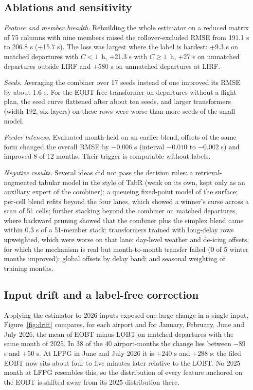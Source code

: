 \documentclass[
  manuscript=article,  %
  layout=preprint,  %
  year=20xx,
  volume=x,
]{extra/joas}
\begin{document}
\subsection{Ablations and sensitivity}

\textit{Feature and member breadth.} Rebuilding the whole estimator on a reduced matrix of 75 columns with nine members raised the rollover-excluded RMSE from 191.1 s to 206.8 s (+15.7 s). The loss was largest where the label is hardest: +9.3 s on matched departures with $C<1$~h, +21.3 s with $C \geq 1$~h, +27 s on unmatched departures outside LIRF and +580 s on unmatched departures at LIRF.

\textit{Seeds.} Averaging the combiner over 17 seeds instead of one improved its RMSE by about 1.6 s. For the EOBT-free transformer on departures without a flight plan, the seed curve flattened after about ten seeds, and larger transformers (width 192, six layers) on these rows were worse than more seeds of the small model.

\textit{Feeder lateness.} Evaluated month-held on an earlier blend, offsets of the same form changed the overall RMSE by $-0.006$ s (interval $-0.010$ to $-0.002$ s) and improved 8 of 12 months. Their trigger is computable without labels.

\textit{Negative results.} Several ideas did not pass the decision rules: a retrieval-augmented tabular model in the style of TabR \cite{gorishniy2024tabr} (weak on its own, kept only as an auxiliary expert of the combiner); a queueing fixed-point model of the surface; per-cell blend refits beyond the four lanes, which showed a winner's curse across a scan of 51 cells; further stacking beyond the combiner on matched departures, where backward pruning showed that the combiner plus the simplex blend came within 0.3 s of a 51-member stack; transformers trained with long-delay rows upweighted, which were worse on that lane; day-level weather and de-icing offsets, for which the mechanism is real but month-to-month transfer failed (0 of 5 winter months improved); global offsets by delay band; and seasonal weighting of training months.

\subsection{Input drift and a label-free correction}
\label{sec:drift}

Applying the estimator to 2026 inputs exposed one large change in a single input. Figure~\ref{fig:drift} compares, for each airport and for January, February, June and July 2026, the mean of EOBT minus LOBT on matched departures with the same month of 2025. In 38 of the 40 airport-months the change lies between $-89$ s and $+50$ s. At LFPG in June and July 2026 it is $+240$ s and $+288$ s: the filed EOBT now sits about four to five minutes later relative to the LOBT. No 2025 month at LFPG resembles this, so the distribution of every feature anchored on the EOBT is shifted away from its 2025 distribution there.
\end{document}
